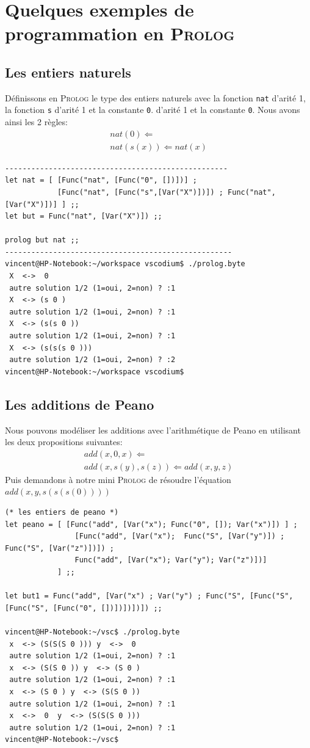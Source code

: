 \section{Quelques exemples de programmation en \textsc{Prolog}}
\subsection{Les entiers naturels}
Définissons en \textsc{Prolog} le type des entiers naturels avec la fonction \texttt{nat}  d'arité 1, la fonction \texttt{s} d'arité 1 et la constante \texttt{0}.
d'arité 1 et la constante \texttt{0}.
Nous avons ainsi les 2 règles:
$$
\begin{array}{l}
nat(0) \Leftarrow \\
nat(s(x)) \Leftarrow nat(x)
\end{array}
$$
\begin{verbatim}
---------------------------------------------------
let nat = [ [Func("nat", [Func("0", [])])] ;
            [Func("nat", [Func("s",[Var("X")])]) ; Func("nat", [Var("X")])] ] ;;
let but = Func("nat", [Var("X")]) ;; 

prolog but nat ;;
----------------------------------------------------
vincent@HP-Notebook:~/workspace vscodium$ ./prolog.byte 
 X  <->  0 
 autre solution 1/2 (1=oui, 2=non) ? :1
 X  <-> (s 0 )
 autre solution 1/2 (1=oui, 2=non) ? :1
 X  <-> (s(s 0 ))
 autre solution 1/2 (1=oui, 2=non) ? :1
 X  <-> (s(s(s 0 )))
 autre solution 1/2 (1=oui, 2=non) ? :2
vincent@HP-Notebook:~/workspace vscodium$ 
\end{verbatim}

\subsection{Les additions de Peano}
Nous pouvons modéliser les additions avec l'arithmétique de Peano en utilisant les deux propositions suivantes:
$$
\begin{array}{l}
	add(x, 0, x) \Leftarrow \\
	add(x, s(y), s(z)) \Leftarrow  add(x,y,z)
\end{array}
$$
Puis demandons à notre mini \textsc{Prolog} de résoudre l'équation $add(x,y, s(s(s(0))))$
\begin{verbatim}
(* les entiers de peano *)
let peano = [ [Func("add", [Var("x"); Func("0", []); Var("x")]) ] ;
				[Func("add", [Var("x");  Func("S", [Var("y")]) ; Func("S", [Var("z")])]) ;
				Func("add", [Var("x"); Var("y"); Var("z")])]
			] ;;

let but1 = Func("add", [Var("x") ; Var("y") ; Func("S", [Func("S", [Func("S", [Func("0", [])])])])]) ;; 

vincent@HP-Notebook:~/vsc$ ./prolog.byte 
 x  <-> (S(S(S 0 ))) y  <->  0 
 autre solution 1/2 (1=oui, 2=non) ? :1
 x  <-> (S(S 0 )) y  <-> (S 0 )
 autre solution 1/2 (1=oui, 2=non) ? :1
 x  <-> (S 0 ) y  <-> (S(S 0 ))
 autre solution 1/2 (1=oui, 2=non) ? :1
 x  <->  0  y  <-> (S(S(S 0 )))
 autre solution 1/2 (1=oui, 2=non) ? :1
vincent@HP-Notebook:~/vsc$ 
\end{verbatim}
